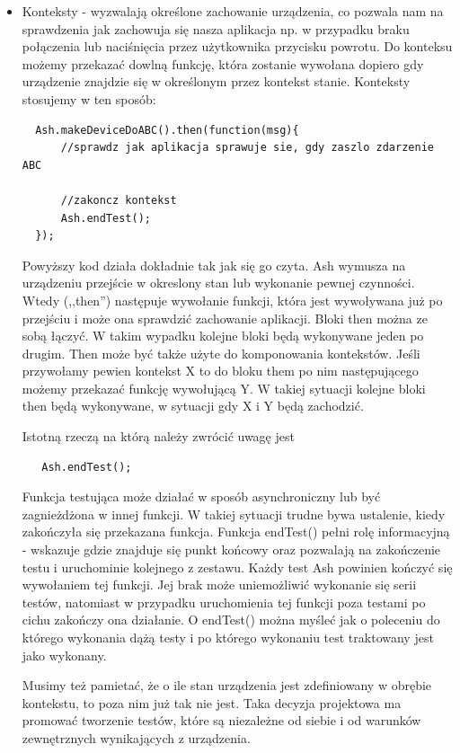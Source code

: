 \documentclass[brudnopis]{xmgr}
\begin{document}
\begin{itemize}
  \item Konteksty - wyzwalają określone zachowanie urządzenia, co pozwala nam na sprawdzenia jak zachowuja się nasza aplikacja np. w przypadku braku połączenia lub naciśnięcia przez użytkownika przycisku powrotu. Do konteksu możemy przekazać dowlną funkcję, która zostanie wywołana dopiero gdy urządzenie znajdzie się w określonym przez kontekst stanie. Konteksty stosujemy w ten sposób:

\begin{lstlisting}
  Ash.makeDeviceDoABC().then(function(msg){
      //sprawdz jak aplikacja sprawuje sie, gdy zaszlo zdarzenie ABC
      
      //zakoncz kontekst
      Ash.endTest();
  });
\end{lstlisting}

Powyższy kod działa dokładnie tak jak się go czyta. Ash wymusza na urządzeniu przejście w okreslony stan lub wykonanie pewnej czynności. Wtedy (,,then'') następuje wywołanie funkcji, która jest wywoływana już po przejściu i może ona sprawdzić zachowanie aplikacji. Bloki then można ze sobą łączyć. W takim wypadku kolejne bloki będą wykonywane jeden po drugim. Then może być także użyte do komponowania kontekstów. Jeśli przywołamy pewien kontekst X to do bloku them po nim następującego możemy przekazać funkcję wywołującą Y. W takiej sytuacji kolejne bloki then będą wykonywane, w sytuacji gdy X i Y będą zachodzić.  

Istotną rzeczą na którą należy zwrócić uwagę jest 

\begin{lstlisting}
   Ash.endTest();
\end{lstlisting}

Funkcja testująca może działać w sposób asynchroniczny lub być zagnieżdżona w innej funkcji. W takiej sytuacji trudne bywa ustalenie, kiedy zakończyła się przekazana funkcja. Funkcja endTest() pełni rolę informacyjną - wskazuje gdzie znajduje się punkt końcowy oraz pozwalają na zakończenie testu i uruchominie kolejnego z zestawu. Każdy test Ash powinien kończyć się wywołaniem tej funkcji. Jej brak może uniemożliwić wykonanie się serii testów, natomiast w przypadku uruchomienia tej funkcji poza testami po cichu zakończy ona działanie. O endTest() można myśleć jak o poleceniu do którego wykonania dążą testy i po którego wykonaniu test traktowany jest jako wykonany. 

Musimy też pamietać, że o ile stan urządzenia jest zdefiniowany w obrębie kontekstu, to poza nim już tak nie jest. Taka decyzja projektowa ma promować tworzenie testów, które są  niezależne od siebie i od warunków zewnętrznych wynikających z urządzenia.


\end{itemize}
\end{document}
